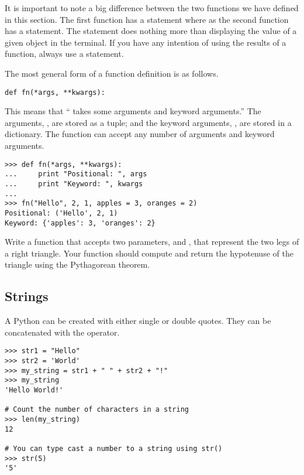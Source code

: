 
It is important to note a big difference between the two functions we have defined in this section.  The first function has a  statement where as the second function has a  statement.  The  statement does nothing more than displaying the value of a given object in the terminal.  If you have any intention of using the results of a function, always use a  statement.

The most general form of a function definition is as follows.
\begin{lstlisting}
def fn(*args, **kwargs):
\end{lstlisting}
This means that `` takes some arguments and keyword arguments.''
The arguments, , are stored as a tuple; and the keyword arguments, , are stored in a dictionary.
The function  can accept any number of arguments and keyword arguments.
\begin{lstlisting}
>>> def fn(*args, **kwargs):
...     print "Positional: ", args
...     print "Keyword: ", kwargs
...     
>>> fn("Hello", 2, 1, apples = 3, oranges = 2)
Positional: ('Hello', 2, 1)
Keyword: {'apples': 3, 'oranges': 2}
\end{lstlisting}

\begin{problem}
Write a function  that accepts two parameters,  and , that represent the two legs of a right triangle.  Your function should compute and return the hypotenuse of the triangle using the Pythagorean theorem. 
\end{problem}


\subsection*{Strings}
A Python  can be created with either single or double quotes. They can be concatenated with the \li{+} operator.
\begin{lstlisting}
>>> str1 = "Hello"
>>> str2 = 'World'
>>> my_string = str1 + " " + str2 + "!"
>>> my_string
'Hello World!'

# Count the number of characters in a string
>>> len(my_string)
12

# You can type cast a number to a string using str()
>>> str(5)
'5'
\end{lstlisting}

